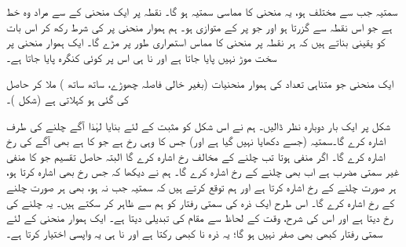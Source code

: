 سمتیہ  جب  سے مختلف ہو، یہ منحنی کا مماسی سمتیہ ہو گا۔ نقطہ  پر ایک منحنی کے  سے مراد  وہ خط ہے جو اس نقطہ سے گزرتا ہو اور جو  پر   کے متوازی ہو۔  ہم ہموار منحنی    پر    کی شرط    رکھ    کر اس بات کو یقینی بناتے ہیں کہ ہر نقطہ پر منحنی کا مماس استمراری طور پر مڑے گا۔ ایک ہموار منحنی پر   سخت  موڑ نہیں پایا جاتا ہے اور نا ہی اس پر کوئی کنگرہ پایا جاتا ہے۔

ایک منحنی  جو متناہی تعداد کی  ہموار  منحنیات  (بغیر خالی فاصلہ چھوڑے، ساتھ ساتھ )    ملا کر حاصل  کی گئی ہو     کہلاتی ہے (شکل )۔

شکل   پر ایک بار دوبارہ نظر ڈالیں۔ ہم نے اس  شکل کو مثبت  کے لئے بنایا لہٰذا    آگے چلنے  کی طرف    اشارہ کرے گا۔سمتیہ  (جسے دکھایا نہیں گیا ہے اور)  جس کا وہی رخ ہے جو  کا ہے  بھی آگے کی رخ اشارہ کرے گا۔ اگر  منفی ہوتا تب   چلنے کے مخالف  رخ اشارہ کرے گا  البتہ حاصل تقسیم   جو  کا منفی غیر سمتی مضرب  ہے اب بھی چلنے کے رخ اشارہ کرے  گا۔ ہم نے دیکھا کہ   جس رخ بھی اشارہ کرتا ہو،   ہر صورت چلنے کے رخ اشارہ کرتا ہے اور ہم توقع کرتے ہیں کہ سمتیہ  جب  نہ ہو،  بھی ہر صورت  چلنے کے رخ اشارہ کرے گا۔ اس طرح ایک ذرہ کی سمتی رفتار کو ہم  سے ظاہر کر سکتے ہیں۔ یہ چلنے کی رخ دیتا ہے اور اس کی شرح، وقت کے لحاظ سے مقام  کی تبدیلی دیتا ہے۔ ایک ہموار منحنی  کے  لئے سمتی رفتار کبھی بھی صفر نہیں ہو گا؛   یہ ذرہ نا کبھی رکتا ہے اور نا ہی یہ واپسی اختیار کرتا ہے۔

